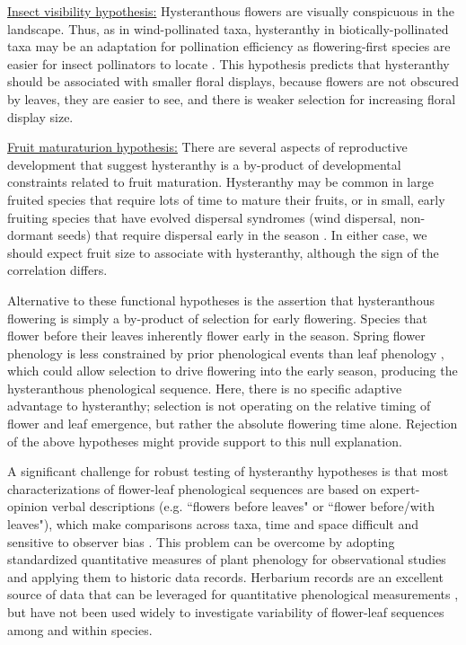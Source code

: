 \documentclass{article}[12pt]
\begin{document}
\underline{Insect visibility hypothesis:} Hysteranthous flowers are visually conspicuous in the landscape. Thus, as in wind-pollinated taxa, hysteranthy in biotically-pollinated taxa may be an adaptation for pollination efficiency as flowering-first species are easier for insect pollinators to locate \citep{Janzen1967}. This hypothesis predicts that hysteranthy should be associated with smaller floral displays, because flowers are not obscured by leaves, they are easier to see, and there is weaker selection for increasing floral display size. 

\underline{Fruit maturaturion hypothesis:} There are several aspects of reproductive development that suggest hysteranthy is a by-product of developmental constraints related to fruit maturation. Hysteranthy may be common in large fruited species that require lots of time to mature their fruits, or in small, early fruiting species that have evolved dispersal syndromes (wind dispersal, non-dormant seeds) that require dispersal early in the season \citep{Primack1987}. In either case, we should expect fruit size to associate with hysteranthy, although the sign of the correlation differs.

Alternative to these functional hypotheses is the assertion that hysteranthous flowering is simply a by-product of selection for early flowering. Species that flower before their leaves inherently flower early in the season. Spring flower phenology is less constrained by prior phenological events than leaf phenology \citep{Savage2019,Ettinger2018}, which could allow selection to drive flowering into the early season, producing the hysteranthous phenological sequence. Here, there is no specific adaptive advantage to hysteranthy;  selection is not operating on the relative timing of flower and leaf emergence, but rather the absolute flowering time alone. Rejection of the above hypotheses might provide support to this null explanation. 

\noindent A significant challenge for robust testing of hysteranthy hypotheses is that most characterizations of flower-leaf phenological sequences are based on expert-opinion verbal descriptions (e.g. ``flowers before leaves" or ``flower before/with leaves"), which make comparisons across taxa, time and space difficult and sensitive to observer bias  \citep[see;][]{Buonaiuto2020}. This problem can be overcome by adopting standardized quantitative measures of plant phenology for observational studies and applying them to historic data records. Herbarium records are an excellent source of data that can be leveraged for quantitative phenological measurements \citep{Willis2017}, but have not been used widely to investigate variability of flower-leaf sequences among and within species.
\end{document}
